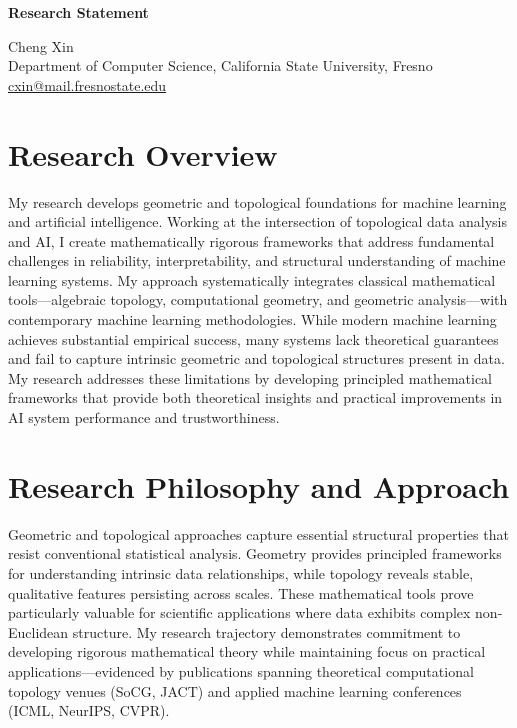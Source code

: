 \documentclass[11pt,letterpaper]{article}
\begin{document}
\begin{center}
    {\Large\textbf{Research Statement}}

    Cheng Xin\\
    Department of Computer Science, California State University, Fresno\\
    \href{mailto:cxin@mail.fresnostate.edu}{cxin@mail.fresnostate.edu}
\end{center}

\vspace{-0.1in}
\section*{Research Overview}
\vspace{-0.1in}

My research develops geometric and topological foundations for machine learning and artificial intelligence. Working at the intersection of topological data analysis and AI, I create mathematically rigorous frameworks that address fundamental challenges in reliability, interpretability, and structural understanding of machine learning systems. My approach systematically integrates classical mathematical tools—algebraic topology, computational geometry, and geometric analysis—with contemporary machine learning methodologies. While modern machine learning achieves substantial empirical success, many systems lack theoretical guarantees and fail to capture intrinsic geometric and topological structures present in data. My research addresses these limitations by developing principled mathematical frameworks that provide both theoretical insights and practical improvements in AI system performance and trustworthiness.

\vspace{-0.1in}
\section*{Research Philosophy and Approach}
\vspace{-0.1in}

Geometric and topological approaches capture essential structural properties that resist conventional statistical analysis. Geometry provides principled frameworks for understanding intrinsic data relationships, while topology reveals stable, qualitative features persisting across scales. These mathematical tools prove particularly valuable for scientific applications where data exhibits complex non-Euclidean structure. My research trajectory demonstrates commitment to developing rigorous mathematical theory while maintaining focus on practical applications—evidenced by publications spanning theoretical computational topology venues (SoCG, JACT) and applied machine learning conferences (ICML, NeurIPS, CVPR).
\end{document}
